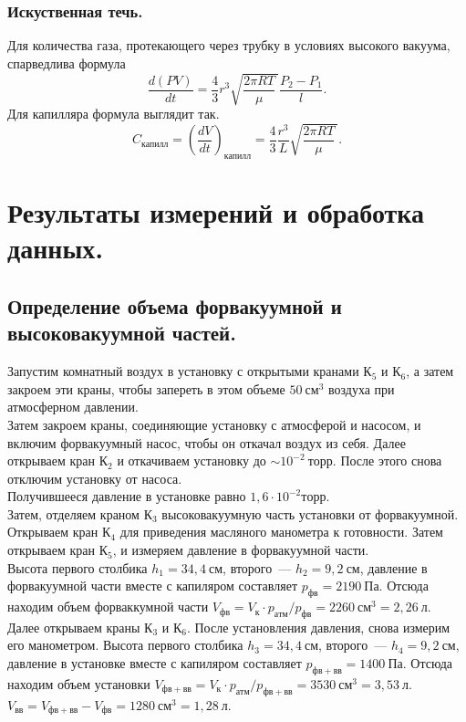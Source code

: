 \documentclass[a4paper,11pt]{article}
\begin{document}
\subsubsection{Искуственная течь.}
Для количества газа, протекающего через трубку в условиях высокого вакуума, спарведлива формула
\begin{equation}    \label{eq5}
  \frac{d(PV)}{dt} = \frac{4}{3} r^{3}\sqrt{\frac{2\pi RT}{\mu}\ }\frac{P_{2} - P_{1}}{l}.
\end{equation}
Для капилляра формула выглядит так.
\begin{equation}    \label{eq6}
  C_{капилл} = \left(\frac{dV}{dt} \right)_{капилл} = \frac{4}{3}\frac{r^{3}}{L}\sqrt{\frac{2\pi RT}{\mu}\ }.
\end{equation}
\section{Результаты измерений и обработка данных.}
\subsection{Определение объема форвакуумной и высоковакуумной частей.}
Запустим комнатный воздух в установку с открытыми кранами $К_{5}$ и $К_{6}$, а затем закроем эти краны, чтобы запереть в этом объеме $50\ см^{3}$ воздуха при атмосферном давлении.\\
Затем закроем краны, соединяющие установку с атмосферой и насосом, и включим форвакуумный насос, чтобы он откачал воздух из себя. Далее открываем кран $К_{2}$ и откачиваем установку до $\sim 10^{-2}\ торр$. После этого снова отключим установку от насоса.\\
Получившееся давление в установке равно $1,6 \cdot 10^{-2} торр$.\\
Затем, отделяем краном $К_{3}$ высоковакуумную часть установки от форвакуумной. Открываем  кран $К_{4}$ для приведения масляного манометра к готовности. Затем открываем кран $К_{5}$, и измеряем давление в форвакуумной части.\\
Высота первого столбика $h_{1} = 34,4\ см$, второго~--- $h_{2} = 9,2\ см$, давление в форвакуумной части вместе с капиляром составляет $p_{фв} = 2190\ Па$. Отсюда находим объем форваккумной части $V_{фв} = V_{к} \cdot p_{атм}/p_{фв} = 2260\ см^{3} = 2,26\ л$.\\
Далее открываем краны $К_{3}$ и $К_{6}$. После установления давления, снова измерим его манометром.
Высота первого столбика $h_{3} = 34,4\ см$, второго~--- $h_{4} = 9,2\ см$, давление в установке вместе с капиляром составляет $p_{фв + вв} = 1400\ Па$. Отсюда находим объем установки $V_{фв + вв} = V_{к} \cdot p_{атм}/p_{фв + вв} = 3530\ см^{3} = 3,53\ л$. $V_{вв} = V_{фв + вв} - V_{фв} = 1280\ см^{3} = 1,28\ л$.
\end{document}
